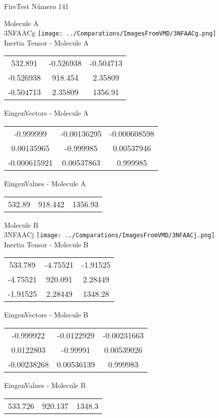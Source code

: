 \vtab[-2cm]
\begin{center}
{\large FireTest \tab Número 141}
\end{center}
\begin{multicols}{2}
\begin{center}

Molecule A \\ 
3NFAACg
\texttt{[image: ../Comparations/ImagesFromVMD/3NFAACg.png]}
\\
Inertia Tensor - Molecule A \\
\vtab

\begin{tabular}{|c c c|}
532.891	 & 	-0.526938	 & 	-0.504713	 \\
-0.526938	 & 	918.454	 & 	2.35809	 \\
-0.504713	 & 	2.35809	 & 	1356.91
\end{tabular}

\vtab
 EingenVectors - Molecule A     \\
\vtab
\begin{tabular}{|c c c|}
-0.999999	 & 	-0.00136295	 & 	-0.000608598	 \\
0.00135965	 & 	-0.999985	 & 	0.00537946	 \\
-0.000615921	 & 	0.00537863	 & 	0.999985
\end{tabular}

\vtab
 EingenValues - Molecule A     \\
\vtab
\begin{tabular}{|c c c|}
532.89	 & 	918.442	 & 	1356.93	 \\
\end{tabular}
\columnbreak

Molecule B \\ 
3NFAACj
\texttt{[image: ../Comparations/ImagesFromVMD/3NFAACj.png]}
\\
Inertia Tensor - Molecule B \\
\vtab

\begin{tabular}{|c c c|}
533.789	 & 	-4.75521	 & 	-1.91525	 \\
-4.75521	 & 	920.091	 & 	2.28449	 \\
-1.91525	 & 	2.28449	 & 	1348.28
\end{tabular}

\vtab
 EingenVectors - Molecule B     \\
\vtab
\begin{tabular}{|c c c|}
-0.999922	 & 	-0.0122929	 & 	-0.00231663	 \\
0.0122803	 & 	-0.99991	 & 	0.00539026	 \\
-0.00238268	 & 	0.00536139	 & 	0.999983
\end{tabular}

\vtab
 EingenValues - Molecule B     \\
\vtab
\begin{tabular}{|c c c|}
533.726	 & 	920.137	 & 	1348.3	 \\
\end{tabular}

\end{center}
\end{multicols}

